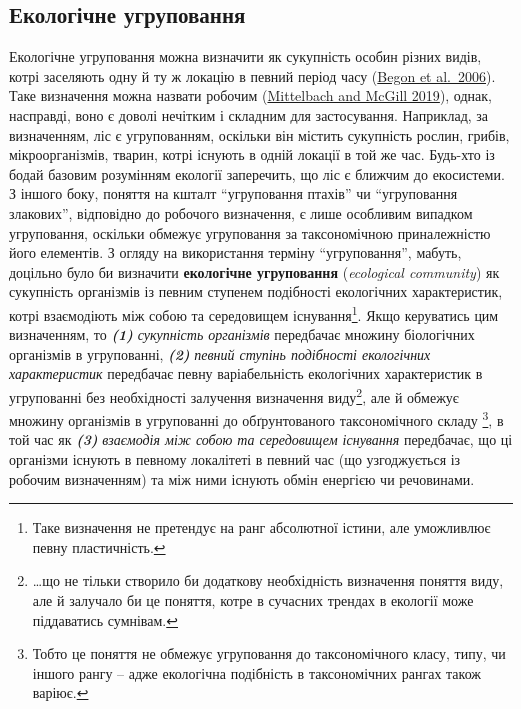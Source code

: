 \documentclass[
  11pt,
]{book}
\begin{document}
\subsection{Екологічне угруповання}\label{community-def}

Екологічне угруповання можна визначити як сукупність особин різних видів, котрі заселяють одну й ту ж локацію в певний період часу (\href{https://scholar.google.com/scholar_lookup?title=Ecology\%3A\%20From\%20Individuals\%20to\%20Ecosystems&author=\%20&author=\%20&author=\%20&publication_year=2006&book=Ecology\%3A\%20From\%20Individuals\%20to\%20Ecosystems}{Begon et al.~2006}). Таке визначення можна назвати робочим (\href{https://doi.org/10.1093/oso/9780198835851.001.0001}{Mittelbach and McGill 2019}), однак, насправді, воно є доволі нечітким і складним для застосування. Наприклад, за визначенням, ліс є угрупованням, оскільки він містить сукупність рослин, грибів, мікроорганізмів, тварин, котрі існують в одній локації в той же час. Будь-хто із бодай базовим розумінням екології заперечить, що ліс є ближчим до екосистеми. З іншого боку, поняття на кшталт ``угруповання птахів'' чи ``угруповання злакових'', відповідно до робочого визначення, є лише особливим випадком угруповання, оскільки обмежує угруповання за таксономічною приналежністю його елементів. З огляду на використання терміну ``угруповання'', мабуть, доцільно було би визначити \textbf{екологічне угруповання} (\emph{ecological community}) як сукупність організмів із певним ступенем подібності екологічних характеристик, котрі взаємодіють між собою та середовищем існування\footnote{Таке визначення не претендує на ранг абсолютної істини, але уможливлює певну пластичність.}. Якщо керуватись цим визначенням, то \textbf{\emph{(1)}} \emph{сукупність організмів} передбачає множину біологічних організмів в угрупованні, \textbf{\emph{(2)}} \emph{певний ступінь подібності екологічних характеристик} передбачає певну варіабельність екологічних характеристик в угрупованні без необхідності залучення визначення виду\footnote{\ldots що не тільки створило би додаткову необхідність визначення поняття виду, але й залучало би це поняття, котре в сучасних трендах в екології може піддаватись сумнівам.}, але й обмежує множину організмів в угрупованні до обґрунтованого таксономічного складу \footnote{Тобто це поняття не обмежує угруповання до таксономічного класу, типу, чи іншого рангу -- адже екологічна подібність в таксономічних рангах також варіює.}, в той час як \textbf{\emph{(3)}} \emph{взаємодія між собою та середовищем існування} передбачає, що ці організми існують в певному локалітеті в певний час (що узгоджується із робочим визначенням) та між ними існують обмін енергією чи речовинами.
\end{document}
